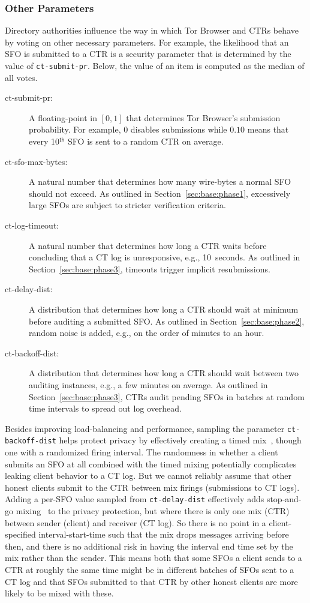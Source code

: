 \subsubsection{Other Parameters} \label{sec:base:consensus:params}
Directory authorities influence the way in which Tor Browser and CTRs behave by
voting on other necessary parameters.  For example, the likelihood that
an SFO is submitted to a CTR is a security parameter that is determined by the
value of \texttt{ct-submit-pr}.  Below, the value of an item is computed as the
median of all votes.
\begin{description}
	\item[ct-submit-pr:] A floating-point in $[0,1]$ that determines Tor
		Browser's submission probability.  For example, $0$ disables submissions
		while $0.10$ means that every 10$^{\mathsf{th}}$ SFO is sent to a
		random CTR on average.
	\item[ct-sfo-max-bytes:] A natural number that determines how many
		wire-bytes a normal SFO should not exceed.  As outlined in
		Section~\ref{sec:base:phase1}, excessively large SFOs are subject
		to stricter verification criteria.
	\item[ct-log-timeout:] A natural number that determines how long a CTR
		waits before concluding that a CT log is unresponsive, e.g., 10~seconds.
		As outlined in Section~\ref{sec:base:phase3}, timeouts trigger implicit
		resubmissions.
	\item[ct-delay-dist:] A distribution that determines how long a CTR should
		wait at minimum before auditing a submitted SFO\@.  As outlined in
		Section~\ref{sec:base:phase2}, random noise is added, e.g., on the order of minutes to an hour.
	\item[ct-backoff-dist:]
		A distribution that determines how long a CTR should wait between two
		auditing instances, e.g., a few minutes on average.  As outlined in
		Section~\ref{sec:base:phase3}, CTRs audit pending SFOs in batches at
		random time intervals to spread out log overhead.
\end{description}

Besides improving load-balancing and performance, sampling the parameter
\texttt{ct-backoff-dist} helps protect privacy by effectively creating
a timed mix~\cite{trickle02}, though one with a randomized firing
interval. The randomness in whether a client submits an SFO at all
combined with the timed mixing potentially complicates leaking client
behavior to a CT log. But we cannot reliably assume that other honest
clients submit to the CTR between mix firings (submissions to CT
logs). Adding a per-SFO value sampled from \texttt{ct-delay-dist}
effectively adds stop-and-go mixing~\cite{kesdogan:ih1998} to the
privacy protection, but where there is only one mix (CTR) between
sender (client) and receiver (CT log). So there is no point in a
client-specified interval-start-time such that the mix drops messages
arriving before then, and there is no additional risk in having the
interval end time set by the mix rather than the sender. This means
both that some SFOs a client sends to a CTR at roughly the same time
might be in different batches of SFOs sent to a CT log and that SFOs
submitted to that CTR by other honest clients are more likely to be
mixed with these.


